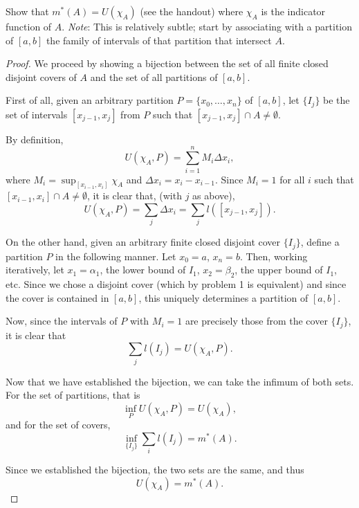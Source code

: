 \documentclass[12pt]{article}
\newenvironment{problem}[2][Problem]{\begin{trivlist}
    \item[\hskip \labelsep {\bfseries #1}\hskip \labelsep {\bfseries #2.}]}{\end{trivlist}}
\theoremstyle{definition}
\begin{document}
\begin{problem}{2}
  \label{prob:2}
  Show that \( m^{*}(A) = U(\chi_A) \) (see the handout) where \(\chi_A\) is the indicator function of \( A \).
  \textit{Note}: This is relatively subtle;
  start by associating with a partition of \( [a,b] \) the family of intervals of that partition that intersect \( A \).
\end{problem}
\begin{proof}
  We proceed by showing a bijection between the set of all finite closed disjoint covers of \( A \) and the set of all partitions of \( [a,b] \).

  First of all, given an arbitrary partition \( P = \{x_0, \dots, x_n\} \) of \( [a,b] \), let \( \{I_j\} \) be the set of intervals \( [x_{j-1}, x_{j}] \) from \( P \) such that \( [x_{j-1}, x_{j}] \cap A \neq \emptyset \).

  By definition,
  \begin{equation}
  \label{eq:23}
  U(\chi_A, P) = \sum\limits_{i=1}^n M_i \Delta x_i,
  \end{equation}
  where \( M_i = \sup_{[x_{i-1}, x_i]} \chi_A \) and \( \Delta x_i = x_i - x_{i-1} \).
  Since \( M_i = 1 \) for all \( i \) such that \( [x_{i-1}, x_i] \cap A \neq \emptyset\), it is clear that, (with \( j \) as above),
  \begin{equation}
  \label{eq:24}
  U(\chi_A, P) = \sum\limits_{j} \Delta x_i = \sum\limits_{j} l([x_{j-1}, x_j]).
  \end{equation}

  On the other hand, given an arbitrary finite closed disjoint cover \( \{ I_j \} \), define a partition \( P \) in the following manner.
  Let \( x_0 = a \), \( x_n = b \).
  Then, working iteratively, let \( x_1 = \alpha_1 \), the lower bound of \( I_1 \), \( x_2 = \beta_2 \), the upper bound of \( I_1 \), etc.
  Since we chose a disjoint cover (which by problem 1 is equivalent) and since the cover is contained in \( [a,b] \), this uniquely determines a partition of \( [a,b] \).

  Now, since the intervals of \( P \) with \( M_i = 1 \) are precisely those from the cover \( \{I_j\} \), it is clear that
  \begin{equation}
  \label{eq:25}
  \sum\limits_j l(I_j) = U(\chi_A, P).
  \end{equation}

  Now that we have established the bijection, we can take the infimum of both sets.
  For the set of partitions, that is
  \begin{equation}
  \label{eq:26}
  \inf_P U(\chi_A, P) = U(\chi_{A}),
\end{equation}
and for the set of covers,
\begin{equation}
\label{eq:27}
\inf_{\{I_j\}} \sum\limits_i l(I_j) = m^{*}(A).
\end{equation}

Since we established the bijection, the two sets are the same, and thus
\begin{equation}
\label{eq:28}
U(\chi_A) = m^{*}(A).
\end{equation}
\end{proof}
\end{document}
